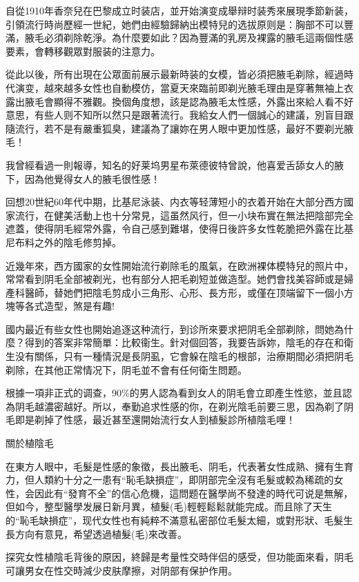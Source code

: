 \documentclass[12pt,UTF8]{ctexbook}
\begin{document}
自從1910年香奈兒在巴黎成立时装店，並开始演变成舉辩时装秀來展現季節新装，引領流行時尚歷經一世紀，她們由經驗歸納出模特兒的选拔原则是：胸部不可以豐滿，腋毛必須剃除乾淨。為什麼要如此？因為豐滿的乳房及裸露的腋毛這兩個性感要素，會轉移觀眾對服装的注意力。

從此以後，所有出現在公眾面前展示最新時装的女模，皆必須把腋毛剃除，經過時代演变，越來越多女性也自動模仿，當夏天來臨前即剃光腋毛理由是穿著無袖上衣露出腋毛會顯得不雅觀。換個角度想，該是認為腋毛太性感，外露出來給人看不好意思，有些人则不知所以然只是跟著流行。我給女人們一個誠心的建議，別盲目跟隨流行，若不是有嚴重狐臭，建議為了讓妳在男人眼中更加性感，最好不要剃光腋毛！

我曾經看過一則報導，知名的好莱坞男星布萊德彼特曾說，他喜爱舌舔女人的腋下，因為他覺得女人的腋毛很性感！

回想20世紀60年代中期，比基尼泳装、内衣等轻薄短小的衣着开始在大部分西方國家流行，在健美活動上也十分常見，這虽然风行，但一小块布實在無法把陰部完全遮蓋，使得阴毛經常外露，令自己感到難堪，使得日後許多女性乾脆把外露在比基尼布料之外的陰毛修剪掉。

近幾年來，西方國家的女性開始流行剃除毛的風氣，在欧洲裸体模特兒的照片中，常常看到阴毛全部被剃光，也有部分人把毛剃短並做造型。她們會找美容師或是婦產科醫師，替她們把陰毛剪成小三角形、心形、長方形，或僅在顶端留下一個小方塊等各式造型，煞是有趣!

國内最近有些女性也開始追逐这种流行，到诊所來要求把阴毛全部剃除，問她為什麼？得到的答案非常簡單：比較衞生。針对個回答，我要告訴妳，陰毛的存在和衛生没有關係，只有一種情況是長阴虱，它會躲在陰毛的根部，治療期間必須把阴毛剃除，在其他正常情况下，阴毛並不會有任何衛生問题。

根據一項非正式的调查，90\%的男人認為看到女人的阴毛會立即產生性慾，並且認為阴毛越濃密越好。所以，奉勤追求性感的你，在剃光陰毛前要三思，因為剃了阴毛即是剃掉了性感，最近甚至還開始流行女人到植髮診所植陰毛哩！

關於植陰毛

在東方人眼中，毛髮是性感的象徵，長出腋毛、阴毛，代表著女性成熟、擁有生育力，但人類約十分之一患有“恥毛缺損症”，即阴部完全沒有毛髮或較為稀疏的女性，会因此有“發育不全”的信心危機，這問题在醫學尚不發達的時代可说是無解，但如今，整型醫學发展日新月異，植髮(毛)輕輕鬆鬆就能完成。而且除了天生的“恥毛缺損症”，现代女性也有純粹不滿意私密部位毛髮太細，或對形狀、毛髮生長方向有意見，希望透過植髮(毛)來改善。

探究女性植陰毛背後的原因，終歸是考量性交時伴侣的感受，但功能面來看，阴毛可讓男女在性交時減少皮肤摩擦，对阴部有保护作用。
\end{document}
